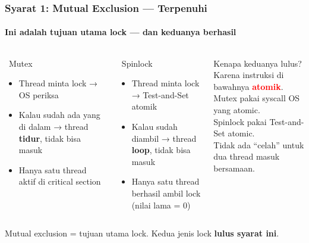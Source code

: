 \documentclass[t,aspectratio=169,xcolor=dvipsnames]{beamer}
\newcommand{\tem}[1]{\textbf{\textcolor{red}{#1}}}
\begin{document}
\begin{frame}[shrink=18]
    \frametitle{Syarat 1: Mutual Exclusion — Terpenuhi}
    \framesubtitle{Ini adalah tujuan utama lock — dan keduanya berhasil}
    \footnotesize

    \begin{columns}[T]
        \begin{exampleblock}{\checkmark\ Mutex}
            \begin{itemize}
                \item Thread minta lock → OS periksa
                \item Kalau sudah ada yang di dalam → thread \textbf{tidur}, tidak bisa masuk
                \item Hanya satu thread aktif di critical section
            \end{itemize}
        \end{exampleblock}

        \begin{exampleblock}{\checkmark\ Spinlock}
            \begin{itemize}
                \item Thread minta lock → Test-and-Set atomik
                \item Kalau sudah diambil → thread \textbf{loop}, tidak bisa masuk
                \item Hanya satu thread berhasil ambil lock (nilai lama = 0)
            \end{itemize}
        \end{exampleblock}

        \begin{block}{Kenapa keduanya lulus?}
            Karena instruksi di bawahnya \tem{atomik}.\\[0.5em]
            Mutex pakai syscall OS yang atomic.\\
            Spinlock pakai Test-and-Set atomic.\\[0.5em]
            Tidak ada ``celah'' untuk dua thread masuk bersamaan.
        \end{block}
    \end{columns}

    \vspace{0.3em}
    \begin{block}{}
        \centering
        \footnotesize
        Mutual exclusion = tujuan utama lock. Kedua jenis lock \textbf{lulus syarat ini}.
    \end{block}
\end{frame}
\end{document}
